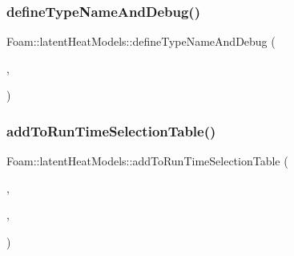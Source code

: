 \subsubsection{\texorpdfstring{define\+Type\+Name\+And\+Debug()}{defineTypeNameAndDebug()}\hspace{0.1cm}{\footnotesize\ttfamily [3/3]}}
{\footnotesize\ttfamily Foam\+::latent\+Heat\+Models\+::define\+Type\+Name\+And\+Debug (\begin{DoxyParamCaption}\item[{\hyperlink{classFoam_1_1latentHeatModels_1_1water}{water}}]{,  }\item[{0}]{ }\end{DoxyParamCaption})}

\mbox{\label{namespaceFoam_1_1latentHeatModels_a541220b30957205cae1c7d90d5996619}} 
\subsubsection{\texorpdfstring{add\+To\+Run\+Time\+Selection\+Table()}{addToRunTimeSelectionTable()}\hspace{0.1cm}{\footnotesize\ttfamily [3/3]}}
{\footnotesize\ttfamily Foam\+::latent\+Heat\+Models\+::add\+To\+Run\+Time\+Selection\+Table (\begin{DoxyParamCaption}\item[{\hyperlink{classFoam_1_1latentHeatModel}{latent\+Heat\+Model}}]{,  }\item[{\hyperlink{classFoam_1_1latentHeatModels_1_1water}{water}}]{,  }\item[{latent\+Heat\+Models}]{ }\end{DoxyParamCaption})}

